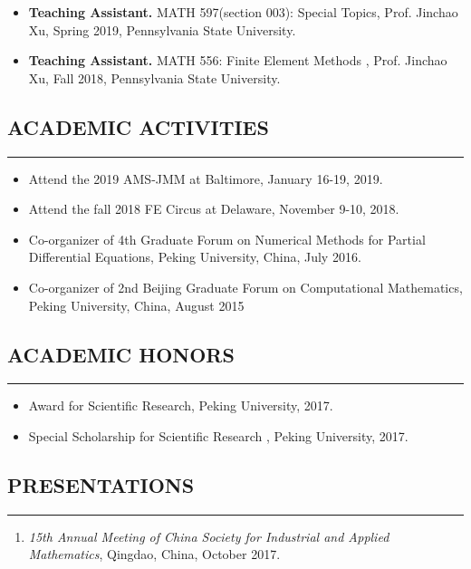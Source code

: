 \documentclass[10pt,a4]{article}
\begin{document}
\begin{small}
\begin{itemize}
\item {\bf Teaching Assistant.} MATH 597(section 003): Special Topics, Prof. Jinchao Xu, Spring 2019, Pennsylvania State University.

\item {\bf Teaching Assistant.} MATH 556: Finite Element Methods , Prof. Jinchao Xu, Fall 2018, Pennsylvania State University.

\end{itemize}
\subsection*{ACADEMIC ACTIVITIES}
\hrule
\vspace{0.2cm}
\begin{itemize}
	\item Attend the 2019 AMS-JMM at Baltimore, January 16-19, 2019.
	\item Attend the fall 2018 FE Circus at Delaware, November 9-10, 2018.
	\item Co-organizer of 4th Graduate Forum on Numerical Methods for Partial Differential Equations, Peking University, China, July 2016.
	\item Co-organizer of 2nd Beijing Graduate Forum on Computational Mathematics, Peking University, China, August 2015
\end{itemize}
 
\subsection*{ACADEMIC HONORS}
\hrule
\vspace{0.2cm}
\begin{itemize}
	\item Award for Scientific Research, Peking University, 2017.
	\item Special Scholarship for Scientific Research , Peking University, 2017.
\end{itemize}
 
\subsection*{PRESENTATIONS}
\hrule
\vspace{0.2cm}

\begin{enumerate}
    \item 
       {\it 15th Annual Meeting of China Society for Industrial and Applied Mathematics}, Qingdao, China, October 2017. 


\end{enumerate}
\end{small}
\end{document}

